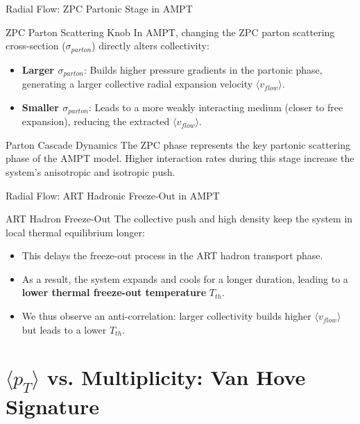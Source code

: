 \documentclass[aspectratio=169]{beamer}
\begin{document}
\begin{frame}{Radial Flow: ZPC Partonic Stage in AMPT}
    \begin{block}{ZPC Parton Scattering Knob}
        In AMPT, changing the ZPC parton scattering cross-section ($\sigma_{parton}$) directly alters collectivity:
        \begin{itemize}
            \item \textbf{Larger $\sigma_{parton}$}: Builds higher pressure gradients in the partonic phase, generating a larger collective radial expansion velocity $\langle v_{flow} \rangle$.
            \item \textbf{Smaller $\sigma_{parton}$}: Leads to a more weakly interacting medium (closer to free expansion), reducing the extracted $\langle v_{flow} \rangle$.
        \end{itemize}
    \end{block}
    \begin{block}{Parton Cascade Dynamics}
        The ZPC phase represents the key partonic scattering phase of the AMPT model. Higher interaction rates during this stage increase the system's anisotropic and isotropic push.
    \end{block}
\end{frame}

\begin{frame}{Radial Flow: ART Hadronic Freeze-Out in AMPT}
    \begin{block}{ART Hadron Freeze-Out}
        The collective push and high density keep the system in local thermal equilibrium longer:
        \begin{itemize}
            \item This delays the freeze-out process in the ART hadron transport phase.
            \item As a result, the system expands and cools for a longer duration, leading to a \textbf{lower thermal freeze-out temperature} $T_{th}$.
            \item We thus observe an anti-correlation: larger collectivity builds higher $\langle v_{flow} \rangle$ but leads to a lower $T_{th}$.
        \end{itemize}
    \end{block}
\end{frame}

\section{$\langle p_T \rangle$ vs. Multiplicity: Van Hove Signature}
\end{document}
